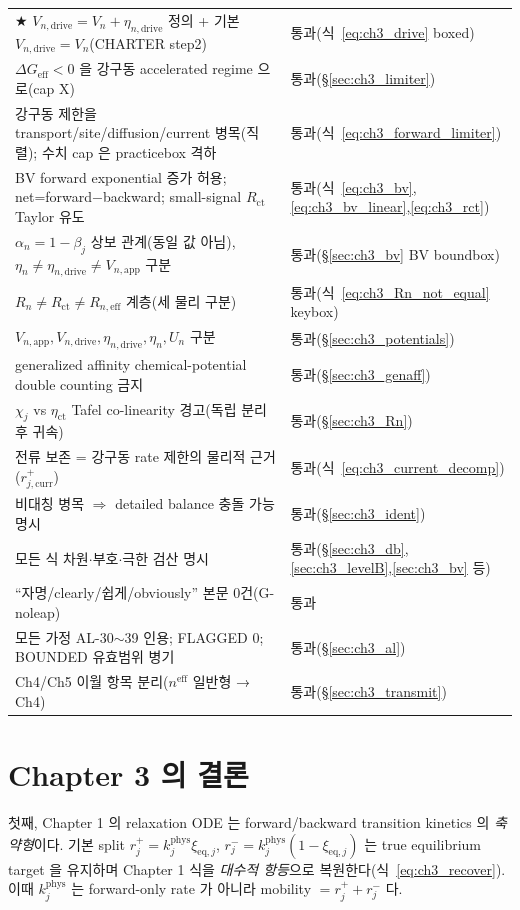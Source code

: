 \documentclass[11pt,a4paper]{article}
\newcommand{\eff}{\mathrm{eff}}
\newcommand{\eq}{\mathrm{eq}}
\newcommand{\app}{\mathrm{app}}
\newcommand{\drive}{\mathrm{drive}}
\newcommand{\ct}{\mathrm{ct}}
\newcommand{\curr}{\mathrm{curr}}
\begin{document}
{\begin{longtable}{>{\raggedright\arraybackslash}p{} >{\raggedright\arraybackslash}p{}}
★ $V_{n,\drive}=V_n+\eta_{n,\drive}$ 정의 + 기본 $V_{n,\drive}=V_n$(CHARTER step2) & 통과(식~\eqref{eq:ch3_drive} boxed) \\
$\Delta G_{\eff}<0$ 을 강구동 accelerated regime 으로(cap X) & 통과(\S\ref{sec:ch3_limiter}) \\
강구동 제한을 transport/site/diffusion/current 병목(직렬); 수치 cap 은 practicebox 격하 & 통과(식~\eqref{eq:ch3_forward_limiter}) \\
BV forward exponential 증가 허용; net=forward$-$backward; small-signal $R_\ct$ Taylor 유도 & 통과(식~\eqref{eq:ch3_bv},\allowbreak\eqref{eq:ch3_bv_linear},\allowbreak\eqref{eq:ch3_rct}) \\
$\alpha_n=1-\beta_j$ 상보 관계(동일 값 아님), $\eta_n\ne\eta_{n,\drive}\ne V_{n,\app}$ 구분 & 통과(\S\ref{sec:ch3_bv} BV boundbox) \\
$R_n\ne R_\ct\ne R_{n,\eff}$ 계층(세 물리 구분) & 통과(식~\eqref{eq:ch3_Rn_not_equal} keybox) \\
$V_{n,\app},V_{n,\drive},\eta_{n,\drive},\eta_n,U_n$ 구분 & 통과(\S\ref{sec:ch3_potentials}) \\
generalized affinity chemical-potential double counting 금지 & 통과(\S\ref{sec:ch3_genaff}) \\
$\chi_j$ vs $\eta_\ct$ Tafel co-linearity 경고(독립 분리 후 귀속) & 통과(\S\ref{sec:ch3_Rn}) \\
전류 보존 = 강구동 rate 제한의 물리적 근거($r_{j,\curr}^+$) & 통과(식~\eqref{eq:ch3_current_decomp}) \\
비대칭 병목 $\Rightarrow$ detailed balance 충돌 가능 명시 & 통과(\S\ref{sec:ch3_ident}) \\
모든 식 차원$\cdot$부호$\cdot$극한 검산 명시 & 통과(\S\ref{sec:ch3_db},\ref{sec:ch3_levelB},\ref{sec:ch3_bv} 등) \\
``자명/clearly/쉽게/obviously'' 본문 0건(G-noleap) & 통과 \\
모든 가정 AL-30$\sim$39 인용; FLAGGED 0; BOUNDED 유효범위 병기 & 통과(\S\ref{sec:ch3_al}) \\
Ch4/Ch5 이월 항목 분리($n^\eff$ 일반형 → Ch4) & 통과(\S\ref{sec:ch3_transmit}) \\
\bottomrule
\end{longtable}
}

\section{Chapter 3 의 결론}\label{sec:ch3_concl}
첫째, Chapter 1 의 relaxation ODE 는 forward/backward transition kinetics 의 \emph{축약형}이다. 기본 split
$r_j^+=k_j^{\mathrm{phys}}\xi_{\eq,j}$, $r_j^-=k_j^{\mathrm{phys}}(1-\xi_{\eq,j})$ 는 true equilibrium target 을
유지하며 Chapter 1 식을 \emph{대수적 항등}으로 복원한다(식~\eqref{eq:ch3_recover}). 이때 $k_j^{\mathrm{phys}}$ 는
forward-only rate 가 아니라 mobility $=r_j^++r_j^-$ 다.
\end{document}
